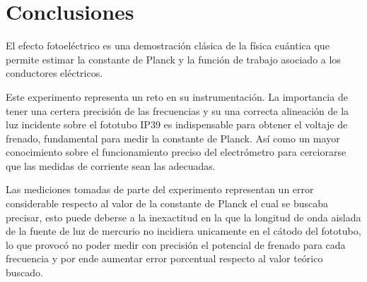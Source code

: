 \documentclass[12pt]{IEEEtran}
\begin{document}
\section{Conclusiones}
El efecto fotoeléctrico es una demostración clásica de la física cuántica que permite estimar la constante de Planck y la función de trabajo asociado a los conductores eléctricos.

Este experimento representa un reto en su instrumentación. La importancia de tener una certera precisión de las frecuencias y su una correcta alineación de la luz incidente sobre el fototubo IP39 es indispensable para obtener el voltaje de frenado, fundamental para medir la constante de Planck. Así como un mayor conocimiento sobre el funcionamiento preciso del electrómetro para cerciorarse que las medidas de corriente sean las adecuadas.

Las mediciones tomadas de parte del experimento representan un error considerable respecto al valor de la constante de Planck el cual se buscaba precisar, esto puede deberse a la inexactitud en la que la longitud de onda  aislada de la fuente de luz de mercurio no incidiera unicamente en el cátodo del fototubo, lo que provocó no poder medir con precisión el potencial de frenado para cada frecuencia y por ende aumentar error porcentual respecto al valor teórico buscado.


\nocite{*}
\printbibliography
\end{document}
